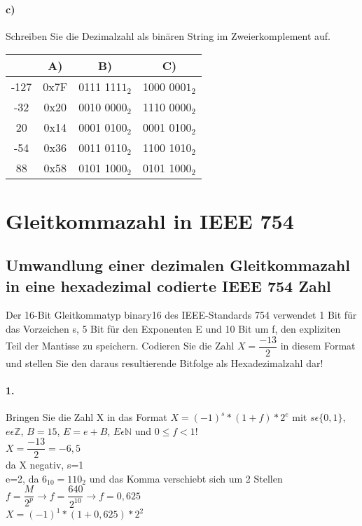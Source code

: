 \documentclass[paper=a4, fontsize=11pt]{scrartcl}
\numberwithin{equation}{section}
\numberwithin{figure}{section}
\numberwithin{table}{section}
\begin{document}
\paragraph{c)}
Schreiben Sie die Dezimalzahl als binären String im Zweierkomplement auf. \\

\begin{tabular}{|c|c|c|c|}
\hline
 & A) & B) & C) \\
\hline 
-127 & 0x7F & 0111 111$1_{2}$ & 1000 000$1_{2}$ \\
\hline
-32  & 0x20 & 0010 000$0_{2}$ & 1110 000$0_{2}$ \\
\hline
20   & 0x14 & 0001 010$0_{2}$ & 0001 010$0_{2}$ \\
\hline
-54  & 0x36 & 0011 011$0_{2}$ & 1100 101$0_{2}$ \\
\hline
88   & 0x58 & 0101 100$0_{2}$ & 0101 100$0_{2}$ \\
\hline
\end{tabular}


\section{Gleitkommazahl in IEEE 754 }

\subsection{Umwandlung einer dezimalen Gleitkommazahl in eine hexadezimal codierte IEEE 754 Zahl}

Der 16-Bit Gleitkommatyp binary16 des IEEE-Standards 754 verwendet 1 Bit für das Vorzeichen s, 5 Bit für den Exponenten E und 10 Bit um f, den expliziten Teil der Mantisse zu speichern. Codieren Sie die Zahl $X=\dfrac{-13}{2}$ in diesem Format und stellen Sie den daraus resultierende Bitfolge als Hexadezimalzahl dar! \\

\paragraph{1.}
Bringen Sie die Zahl X in das Format $X=(-1)^{s}*(1+f)*2^{e}$ mit $s \epsilon \{0,1 \}$, $e \epsilon \mathbb{Z}$, $B=15$, $E=e+B$, $E \epsilon \mathbb{N}$ und $0 \leqslant f < 1$! \\

$X=\dfrac{-13}{2}=-6,5$ \\
da X negativ, s=1 \\
e=2, da $6_{10}=110_{2}$ und das Komma verschiebt sich um 2 Stellen \\
$f=\dfrac{M}{2^{p}} \rightarrow f=\dfrac{640}{2^{10}} \rightarrow f=0,625$ \\
$X=(-1)^{1}*(1+0,625)*2^{2}$ 
\end{document}
